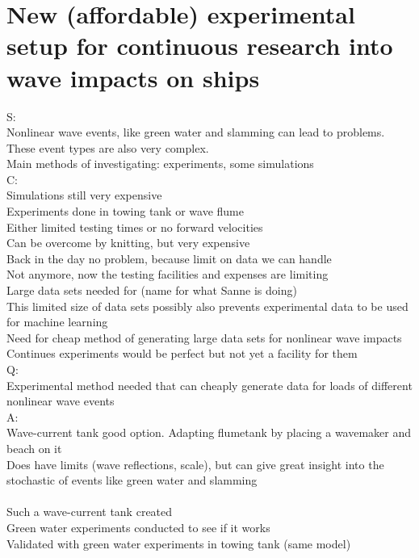 \chapter*{New (affordable) experimental setup for continuous research into wave impacts on ships}
S: \\
Nonlinear wave events, like green water and slamming can lead to problems. \\
These event types are also very complex. \\
Main methods of investigating: experiments, some simulations \\
C: \\
Simulations still very expensive \\
Experiments done in towing tank or wave flume \\
Either limited testing times or no forward velocities \\
Can be overcome by knitting, but very expensive \\
Back in the day no problem, because limit on data we can handle \\
Not anymore, now the testing facilities and expenses are limiting \\
Large data sets needed for (name for what Sanne is doing)\\
This limited size of data sets possibly also prevents experimental data to be used for machine learning \\
Need for cheap method of generating large data sets for nonlinear wave impacts \\
Continues experiments would be perfect but not yet a facility for them\\
Q:\\
Experimental method needed that can cheaply generate data for loads of different nonlinear wave events \\
A:\\
Wave-current tank good option. Adapting flumetank by placing a wavemaker and beach on it\\
Does have limits (wave reflections, scale), but can give great insight into the stochastic of events like green water and slamming \\
\\


Such a wave-current tank created \\
Green water experiments conducted to see if it works \\
Validated with green water experiments in towing tank (same model) \\


